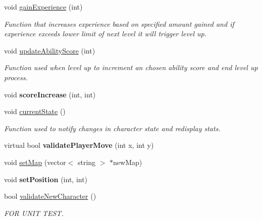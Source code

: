 \begin{DoxyCompactItemize}
\hypertarget{class_characters_a77bd85803742621607c58d7c3593d7b0}{}\label{class_characters_a77bd85803742621607c58d7c3593d7b0} 
void \hyperlink{class_characters_a77bd85803742621607c58d7c3593d7b0}{gain\+Experience} (int)
\begin{DoxyCompactList}\small\item\em Function that increases experience based on specified amount gained and if experience exceeds lower limit of next level it will trigger level up. \end{DoxyCompactList}\item 
\hypertarget{class_characters_af3328b1a080cff8bab2af7597f98be6a}{}\label{class_characters_af3328b1a080cff8bab2af7597f98be6a} 
void \hyperlink{class_characters_af3328b1a080cff8bab2af7597f98be6a}{update\+Ability\+Score} (int)
\begin{DoxyCompactList}\small\item\em Function used when level up to increment an chosen ability score and end level up process. \end{DoxyCompactList}\item 
\hypertarget{class_characters_aef5536d88930d9aff77844d9eec7c71c}{}\label{class_characters_aef5536d88930d9aff77844d9eec7c71c} 
void {\bfseries score\+Increase} (int, int)
\item 
\hypertarget{class_characters_a4359f1dd1537ed6fac7f5ff47801e4ca}{}\label{class_characters_a4359f1dd1537ed6fac7f5ff47801e4ca} 
void \hyperlink{class_characters_a4359f1dd1537ed6fac7f5ff47801e4ca}{current\+State} ()
\begin{DoxyCompactList}\small\item\em Function used to notify changes in character state and redisplay stats. \end{DoxyCompactList}\item 
\hypertarget{class_characters_a42bbd977aed8772f446510e7fcfd577f}{}\label{class_characters_a42bbd977aed8772f446510e7fcfd577f} 
virtual bool {\bfseries validate\+Player\+Move} (int x, int y)
\item 
void \hyperlink{class_characters_a7ea2bd80b72476d35173691d31e80727}{set\+Map} (vector$<$ string $>$ $\ast$new\+Map)
\item 
\hypertarget{class_characters_a9dac165846c7eb9cacb6a2807a75f845}{}\label{class_characters_a9dac165846c7eb9cacb6a2807a75f845} 
void {\bfseries set\+Position} (int, int)
\item 
bool \hyperlink{class_characters_a1273e2d7fe2e959cd3ed513c5717f6b7}{validate\+New\+Character} ()
\begin{DoxyCompactList}\small\item\em F\+OR U\+N\+IT T\+E\+ST. \end{DoxyCompactList}\item 

\end{DoxyCompactItemize}
